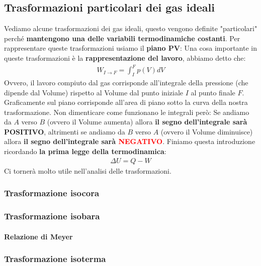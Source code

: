         \subsection{Trasformazioni particolari dei gas ideali}
            Vediamo alcune trasformazioni dei gas ideali, questo vengono definite "particolari" perché \textbf{mantengono una delle variabili termodinamiche costanti}. Per rappresentare queste trasformazioni usiamo il \textbf{piano PV}:
            Una cosa importante in queste trasformazioni è la \textbf{rappresentazione del lavoro}, abbiamo detto che:
            \begin{align*}
                W_{I\rightarrow F}= \int_I^Fp(V)dV
            \end{align*}
            Ovvero, il lavoro compiuto dal gas corrisponde all'integrale della pressione (che dipende dal Volume) rispetto al Volume dal punto iniziale $I$ al punto finale $F$. Graficamente sul piano corrisponde all'area di piano sotto la curva della nostra trasformazione. Non dimenticare come funzionano le integrali però:
            Se andiamo da $A$ verso $B$ (ovvero il Volume aumenta) allora \textbf{il segno dell'integrale sarà \textcolor{OliveGreen}{POSITIVO}}, altrimenti se andiamo da $B$ verso $A$ (ovvero il Volume diminuisce) allora \textbf{il segno dell'integrale sarà \textcolor{Red}{NEGATIVO}}.
            Finiamo questa introduzione ricordando \textbf{la prima legge della termodinamica}:
            \begin{align*}
                \Delta U=Q-W
            \end{align*}
            Ci tornerà molto utile nell'analisi delle trasformazioni.

            \subsubsection{Trasformazione isocora}
            \subsubsection{Trasformazione isobara}
                \paragraph{Relazione di Meyer}

            \subsubsection{Trasformazione isoterma}
